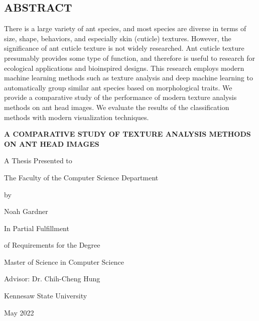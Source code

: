 \documentclass[12pt]{article}
\newcommand{\thesistitle}{
    {\Large A comparative study of texture analysis methods on
ant head images}
}
\begin{document}
\begin{center}
    \section*{ABSTRACT}
\end{center}
\vspace{0.5in}

\noindent There is a large variety of ant species, and most species are diverse
in terms of size, shape, behaviors, and especially skin (cuticle) textures.
However, the significance of ant cuticle texture is not widely researched. Ant
cuticle texture presumably provides some type of function, and therefore is
useful to research for ecological applications and bioinspired designs. This
research employs modern machine learning methods such as texture analysis and
deep machine learning to automatically group similar ant species based on
morphological traits. We provide a comparative study of the performance of
modern texture analysis methods on ant head images. We evaluate the results of
the classification methods with modern visualization techniques.

\newpage

\begin{center}
    \textbf{\MakeUppercase{\thesistitle}}
    \vspace{1in}

    A Thesis Presented to

    The Faculty of the Computer Science Department
    \vspace{1in}

    by
    \vspace{0.5in}

    Noah Gardner
    \vspace{1in}

    In Partial Fulfillment

    of Requirements for the Degree

    Master of Science in Computer Science
    \vspace{0.5in}

    Advisor: Dr. Chih-Cheng Hung
    \vspace{0.5in}

    Kennesaw State University

    May 2022
\end{center}
\newpage
\end{document}
